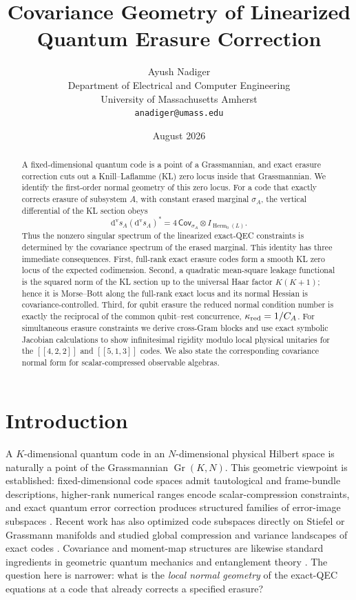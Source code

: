 \documentclass[11pt]{article}
\title{\textbf{Covariance Geometry of Linearized Quantum Erasure Correction}}
\author{Ayush Nadiger\\Department of Electrical and Computer Engineering\\University of Massachusetts Amherst\\\texttt{anadiger@umass.edu}}
\date{August 2026}
\theoremstyle{definition}
\newcommand{\Gr}{\operatorname{Gr}}
\newcommand{\Herm}{\operatorname{Herm}}
\newcommand{\dvs}{\mathrm d^{\mathrm v}\!s}
\begin{document}
\maketitle

\begin{abstract}
A fixed-dimensional quantum code is a point of a Grassmannian, and exact erasure correction cuts out a Knill--Laflamme (KL) zero locus inside that Grassmannian. We identify the first-order normal geometry of this zero locus. For a code that exactly corrects erasure of subsystem $A$, with constant erased marginal $\sigma_A$, the vertical differential of the KL section obeys
\[
\boxed{\dvs_A(\dvs_A)^*=4\,\mathsf{Cov}_{\sigma_A}\otimes I_{\Herm_0(L)}.}
\]
Thus the nonzero singular spectrum of the linearized exact-QEC constraints is determined by the covariance spectrum of the erased marginal. This identity has three immediate consequences. First, full-rank exact erasure codes form a smooth KL zero locus of the expected codimension. Second, a quadratic mean-square leakage functional is the squared norm of the KL section up to the universal Haar factor $K(K+1)$; hence it is Morse--Bott along the full-rank exact locus and its normal Hessian is covariance-controlled. Third, for qubit erasure the reduced normal condition number is exactly the reciprocal of the common qubit--rest concurrence, $\kappa_{\rm red}=1/C_A$. For simultaneous erasure constraints we derive cross-Gram blocks and use exact symbolic Jacobian calculations to show infinitesimal rigidity modulo local physical unitaries for the $[[4,2,2]]$ and $[[5,1,3]]$ codes. We also state the corresponding covariance normal form for scalar-compressed observable algebras.
\end{abstract}

\section{Introduction}
A $K$-dimensional quantum code in an $N$-dimensional physical Hilbert space is naturally a point of the Grassmannian $\Gr(K,N)$. This geometric viewpoint is established: fixed-dimensional code spaces admit tautological and frame-bundle descriptions, higher-rank numerical ranges encode scalar-compression constraints, and exact quantum error correction produces structured families of error-image subspaces \cite{GottesmanZhang,ChoiKribs,LiPoon,KribsMammarella}. Recent work has also optimized code subspaces directly on Stiefel or Grassmann manifolds and studied global compression and variance landscapes of exact codes \cite{DuZhang,Gupta}. Covariance and moment-map structures are likewise standard ingredients in geometric quantum mechanics and entanglement theory \cite{Sawicki,Klyachko}. The question here is narrower: what is the \emph{local normal geometry} of the exact-QEC equations at a code that already corrects a specified erasure?
\end{document}
